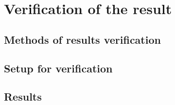 \chapter{Verification of the result}

\section{Methods of results verification}

\section{Setup for verification}

\section{Results}